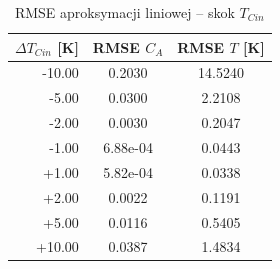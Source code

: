 \begin{table}[H]
\centering
\caption{RMSE aproksymacji liniowej -- skok $T_{Cin}$}
\label{tab:1c_4}
\begin{tabular}{r|c|c}
\hline
$\Delta T_{Cin}$ [K] & RMSE $C_A$ & RMSE $T$ [K] \\
\hline
-10.00 & 0.2030 & 14.5240 \\
-5.00 & 0.0300 & 2.2108 \\
-2.00 & 0.0030 & 0.2047 \\
-1.00 & 6.88e-04 & 0.0443 \\
+1.00 & 5.82e-04 & 0.0338 \\
+2.00 & 0.0022 & 0.1191 \\
+5.00 & 0.0116 & 0.5405 \\
+10.00 & 0.0387 & 1.4834 \\
\hline
\end{tabular}
\end{table}

